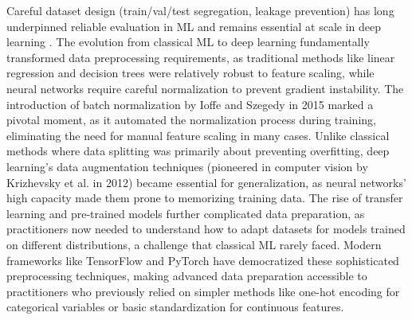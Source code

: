 Careful dataset design (train/val/test segregation, leakage prevention) has long underpinned reliable evaluation in ML and remains essential at scale in deep learning \textcite{Bishop2006,GoodfellowEtAl2016}. The evolution from classical ML to deep learning fundamentally transformed data preprocessing requirements, as traditional methods like linear regression and decision trees were relatively robust to feature scaling, while neural networks require careful normalization to prevent gradient instability. The introduction of batch normalization by Ioffe and Szegedy in 2015 marked a pivotal moment, as it automated the normalization process during training, eliminating the need for manual feature scaling in many cases. Unlike classical methods where data splitting was primarily about preventing overfitting, deep learning's data augmentation techniques (pioneered in computer vision by Krizhevsky et al. in 2012) became essential for generalization, as neural networks' high capacity made them prone to memorizing training data. The rise of transfer learning and pre-trained models further complicated data preparation, as practitioners now needed to understand how to adapt datasets for models trained on different distributions, a challenge that classical ML rarely faced. Modern frameworks like TensorFlow and PyTorch have democratized these sophisticated preprocessing techniques, making advanced data preparation accessible to practitioners who previously relied on simpler methods like one-hot encoding for categorical variables or basic standardization for continuous features.

